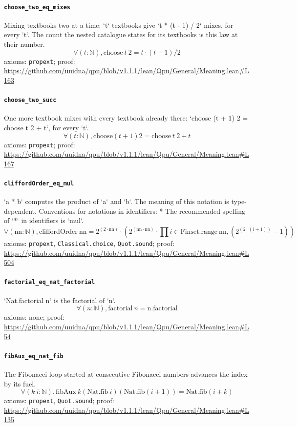 \documentclass[11pt]{article}
\begin{document}
\paragraph{\texttt{choose\_two\_eq\_mixes}}
Mixing textbooks two at a time: `t` textbooks give `t * (t - 1) / 2` mixes, for every `t`. The count the nested catalogue states for its textbooks is this law at their number.
\[ \forall (t : \mathbb{N}), \mathrm{choose}\ t\ 2 = t \cdot (t - 1) / 2 \]
\noindent axioms: \texttt{propext}; proof: \url{https://github.com/uuidna/qpu/blob/v1.1.1/lean/Qpu/General/Meaning.lean\#L163}

\paragraph{\texttt{choose\_two\_succ}}
One more textbook mixes with every textbook already there: `choose (t + 1) 2 = choose t 2 + t`, for every `t`.
\[ \forall (t : \mathbb{N}), \mathrm{choose} (t + 1) 2 = \mathrm{choose}\ t\ 2 + t \]
\noindent axioms: \texttt{propext}; proof: \url{https://github.com/uuidna/qpu/blob/v1.1.1/lean/Qpu/General/Meaning.lean\#L167}

\paragraph{\texttt{cliffordOrder\_eq\_mul}}
`a * b` computes the product of `a` and `b`. The meaning of this notation is type-dependent.   Conventions for notations in identifiers:   * The recommended spelling of `*` in identifiers is `mul`.
\[ \forall (\mathrm{nn} : \mathbb{N}), \mathrm{cliffordOrder}\ \mathrm{nn} = 2 ^{(2 \cdot \mathrm{nn})} \cdot (2 ^{(\mathrm{nn} \cdot \mathrm{nn})} \cdot \prod i \in \mathrm{Finset.range}\ \mathrm{nn}, (2 ^{(2 \cdot (i + 1))} - 1)) \]
\noindent axioms: \texttt{propext}, \texttt{Classical.choice}, \texttt{Quot.sound}; proof: \url{https://github.com/uuidna/qpu/blob/v1.1.1/lean/Qpu/General/Meaning.lean\#L504}

\paragraph{\texttt{factorial\_eq\_nat\_factorial}}
`Nat.factorial n` is the factorial of `n`.
\[ \forall (n : \mathbb{N}), \mathrm{factorial}\ n = \mathrm{n.factorial} \]
\noindent axioms: none; proof: \url{https://github.com/uuidna/qpu/blob/v1.1.1/lean/Qpu/General/Meaning.lean\#L54}

\paragraph{\texttt{fibAux\_eq\_nat\_fib}}
The Fibonacci loop started at consecutive Fibonacci numbers advances the index by its fuel.
\[ \forall (k\ i : \mathbb{N}), \mathrm{fibAux}\ k (\mathrm{Nat.fib}\ i) (\mathrm{Nat.fib} (i + 1)) = \mathrm{Nat.fib} (i + k) \]
\noindent axioms: \texttt{propext}, \texttt{Quot.sound}; proof: \url{https://github.com/uuidna/qpu/blob/v1.1.1/lean/Qpu/General/Meaning.lean\#L135}
\end{document}
